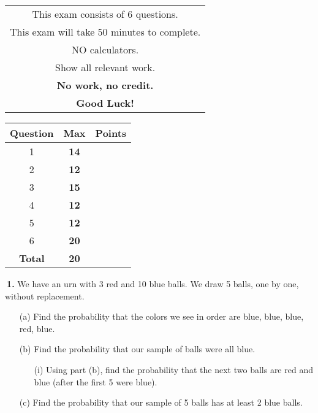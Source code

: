 \documentclass[12pt]{report}
\begin{document}
\begin{minipage}[b]{80mm}
\begin{tabular}{c}
\noindent This exam consists of 6 questions. \\

\noindent This exam will take 50 minutes to complete. \\

\noindent NO calculators.\\

\noindent Show all relevant work.\\
\noindent \textbf{No work, no credit.}\\

\noindent \textbf{Good Luck!}\\
\end{tabular}
\end{minipage}
\begin{minipage}[b]{80mm}
\begin{tabular}{ |c|c|c| }
	\hline
	\textbf{Question} & \textbf{Max} & \textbf{Points} \\
	\hline
	\hline
	1& \textbf{14} & \\
	\hline
	2& \textbf{12} & \\
	\hline
	3& \textbf{15} & \\
	\hline
	4& \textbf{12} & \\
	\hline
	5& \textbf{12} & \\
	\hline
	6& \textbf{20} & \\
	\hline
	\hline
	\textbf{Total} & \textbf{20} & \\
	\hline
\end{tabular}
\end{minipage}

\pagebreak








\noindent {} $~$\textbf{1.} We have an urn with 3 red and 10 blue balls. We draw 5 balls, one by one, without replacement. 
\begin{itemize}
\item [(a)] Find the probability that the colors we see in order are blue, blue, blue, red, blue.		%
\item [(b)] Find the probability that our sample of balls were all blue.					%
	\begin{itemize}
	\item [(i)] Using part (b), find the probability that the next two balls are red and blue (after the first 5 were blue).   %
	\end{itemize}
\item [(c)]  Find the probability that our sample of 5 balls has at least 2 blue balls. 		%
\end{itemize}
\pagebreak
\end{document}
